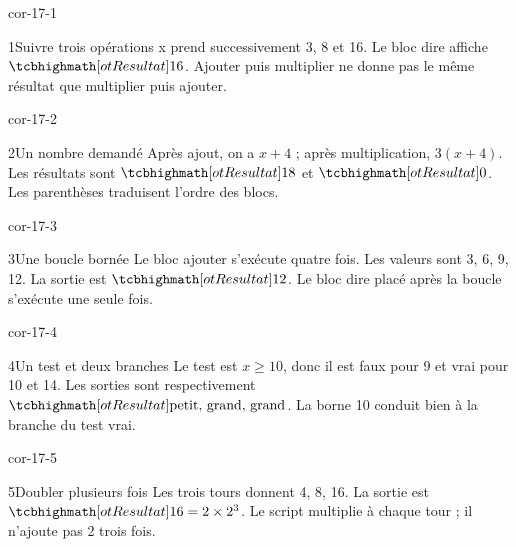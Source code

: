 \clearpage\pagestyle{otMain}\fontsize{11}{15}\selectfont{}
\begin{blocLivre}{cor-17-1}\begin{corrige}{1}{Suivre trois opérations}
x prend successivement 3, 8 et 16. Le bloc dire affiche $\res{16}$. Ajouter puis multiplier ne donne pas le même résultat que multiplier puis ajouter.
\label{fig-cor-17-1}
\end{corrige}\end{blocLivre}
\begin{blocLivre}{cor-17-2}\begin{corrige}{2}{Un nombre demandé}
Après ajout, on a $x+4$ ; après multiplication, $3(x+4)$. Les résultats sont $\res{18}$ et $\res0$. Les parenthèses traduisent l’ordre des blocs.
\label{fig-cor-17-2}
\end{corrige}\end{blocLivre}
\begin{blocLivre}{cor-17-3}\begin{corrige}{3}{Une boucle bornée}
Le bloc ajouter s’exécute quatre fois. Les valeurs sont 3, 6, 9, 12. La sortie est $\res{12}$. Le bloc dire placé après la boucle s’exécute une seule fois.
\label{fig-cor-17-3}
\end{corrige}\end{blocLivre}
\begin{blocLivre}{cor-17-4}\begin{corrige}{4}{Un test et deux branches}
Le test est $x\ge10$, donc il est faux pour 9 et vrai pour 10 et 14. Les sorties sont respectivement $\res{\text{petit, grand, grand}}$. La borne 10 conduit bien à la branche du test vrai.
\label{fig-cor-17-4}
\end{corrige}\end{blocLivre}
\begin{blocLivre}{cor-17-5}\begin{corrige}{5}{Doubler plusieurs fois}
Les trois tours donnent 4, 8, 16. La sortie est $\res{16=2\times2^3}$. Le script multiplie à chaque tour ; il n’ajoute pas 2 trois fois.
\label{fig-cor-17-5}
\end{corrige}\end{blocLivre}
